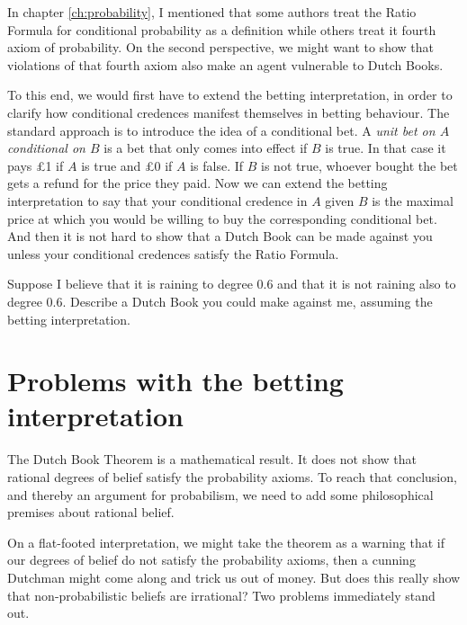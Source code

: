 In chapter \ref{ch:probability}, I mentioned that some authors treat
the Ratio Formula for conditional probability as a definition while
others treat it fourth axiom of probability. On the second
perspective, we might want to show that violations of that fourth
axiom also make an agent vulnerable to Dutch Books.

To this end, we would first have to extend the betting interpretation,
in order to clarify how conditional credences manifest themselves in
betting behaviour. The standard approach is to introduce the idea of a
conditional bet. A \emph{unit bet on $A$ conditional on $B$} is a bet
that only comes into effect if $B$ is true. In that case it pays £1 if
$A$ is true and £0 if $A$ is false. If $B$ is not true, whoever bought
the bet gets a refund for the price they paid. Now we can extend the
betting interpretation to say that your conditional credence in $A$
given $B$ is the maximal price at which you would be willing to buy the
corresponding conditional bet. And then it is not hard to show that a
Dutch Book can be made against you unless your conditional credences
satisfy the Ratio Formula.


\begin{exercise}{2}
  Suppose I believe that it is raining to degree 0.6 and that it is
  not raining also to degree 0.6. Describe a Dutch Book you could make
  against me, assuming the betting interpretation.
\end{exercise}

\section{Problems with the betting interpretation}\label{sec:problem-betting}

The Dutch Book Theorem is a mathematical result. It does not show that
rational degrees of belief satisfy the probability axioms. To reach
that conclusion, and thereby an argument for probabilism, we need to
add some philosophical premises about rational belief.

On a flat-footed interpretation, we might take the theorem as a
warning that if our degrees of belief do not satisfy the probability
axioms, then a cunning Dutchman might come along and trick us out of
money. But does this really show that non-probabilistic beliefs are
irrational? Two problems immediately stand out.

